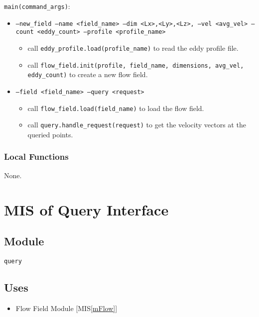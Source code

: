\documentclass[12pt, titlepage]{article}
\begin{document}
\noindent \texttt{main(command\_args)}:
\begin{itemize}
\item \texttt{--new\_field --name <field\_name> --dim <Lx>,<Ly>,<Lz>, --vel <avg\_vel> --count <eddy\_count> --profile <profile\_name>} 
  \begin{itemize}
    \item call \texttt{eddy\_profile.load(profile\_name)} to read the eddy profile file.
    \item call \texttt{flow\_field.init(profile, field\_name, dimensions, avg\_vel, eddy\_count)} to create a new flow field.
  \end{itemize}
\item \texttt{--field <field\_name> --query <request>}
  \begin{itemize}
    \item call \texttt{flow\_field.load(field\_name)} to load the flow field.
    \item call \texttt{query.handle\_request(request)} to get the velocity vectors at the queried points.
  \end{itemize}
\end{itemize}

\subsubsection{Local Functions}

None.


\newpage
\section{MIS of Query Interface} \label{mQuery} 



\subsection{Module}
\texttt{query}

\subsection{Uses}
\begin{itemize}
\item Flow Field Module [MIS\ref{mFlow}]
\end{itemize}
\end{document}
